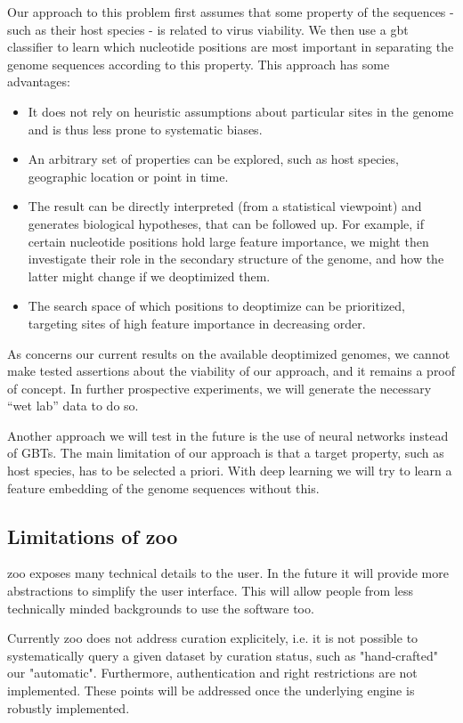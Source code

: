 Our approach to this problem first assumes that some property of the sequences - such as their host species - is related to virus viability. We then use a \gls{gbt} classifier to learn which nucleotide positions are most important in separating the genome sequences according to this property. This approach has some advantages:

\begin{itemize}
    \item It does not rely on heuristic assumptions about particular sites in the genome and is thus less prone to systematic biases.
    \item An arbitrary set of properties can be explored, such as host species, geographic location or point in time.
    \item The result can be directly interpreted (from a statistical viewpoint) and generates biological hypotheses, that can be followed up. For example, if certain nucleotide positions hold large feature importance, we might then investigate their role in the secondary structure of the genome, and how the latter might change if we deoptimized them.
    \item The search space of which positions to deoptimize can be prioritized, targeting sites of high feature importance in decreasing order.
\end{itemize}

As concerns our current results on the available deoptimized genomes, we cannot make tested assertions about the viability of our approach, and it remains a proof of concept. In further prospective experiments, we will generate the necessary ``wet lab'' data to do so.

Another approach we will test in the future is the use of neural networks instead of GBTs. The main limitation of our approach is that a target property, such as host species, has to be selected a priori. With deep learning we will try to learn a feature embedding of the genome sequences without this.


\subsection{Limitations of zoo}

zoo exposes many technical details to the user. In the future it will provide more abstractions to simplify the user interface. This will allow people from less technically minded backgrounds to use the software too.

Currently zoo does not address curation explicitely, i.e. it is not possible to systematically query a given dataset by curation status, such as "hand-crafted" our "automatic". Furthermore, authentication and right restrictions are not implemented. These points will be addressed once the underlying engine is robustly implemented.

